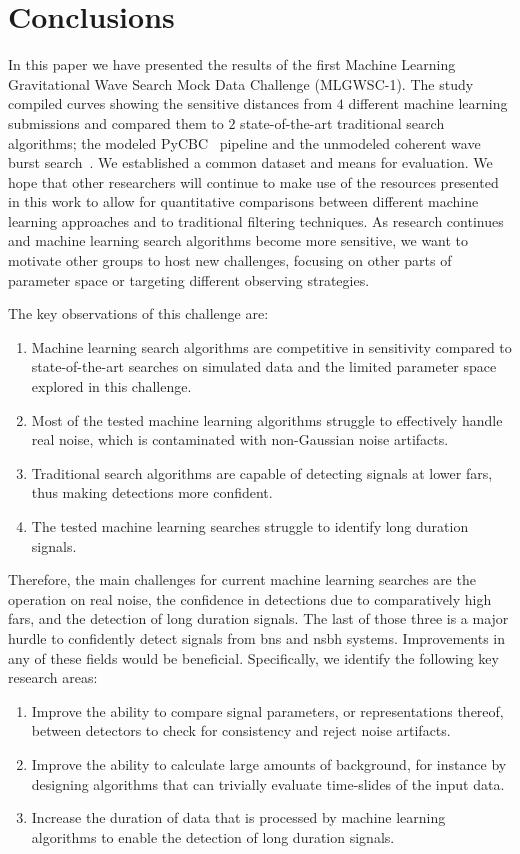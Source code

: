 \section{Conclusions}\label{sec:mlgwsc_conclusions}
In this paper we have presented the results of the first Machine Learning Gravitational Wave Search Mock Data Challenge (MLGWSC-1). The study compiled curves showing the sensitive distances from $4$ different machine learning submissions and compared them to $2$ state-of-the-art traditional search algorithms; the modeled PyCBC~\cite{Usman:2015kfa} pipeline and the unmodeled coherent wave burst search~\cite{Klimenko:2015ypf,Klimenko:2004qh}. We established a common dataset and means for evaluation. We hope that other researchers will continue to make use of the resources presented in this work to allow for quantitative comparisons between different machine learning approaches and to traditional filtering techniques. As research continues and machine learning search algorithms become more sensitive, we want to motivate other groups to host new challenges, focusing on other parts of parameter space or targeting different observing strategies.

The key observations of this challenge are:
\begin{enumerate}
    \item Machine learning search algorithms are competitive in sensitivity compared to state-of-the-art searches on simulated data and the limited parameter space explored in this challenge.
    \item Most of the tested machine learning algorithms struggle to effectively handle real noise, which is contaminated with non-Gaussian noise artifacts.
    \item Traditional search algorithms are capable of detecting signals at lower \acrshort{far}s, thus making detections more confident.
    \item The tested machine learning searches struggle to identify long duration signals.
\end{enumerate}
Therefore, the main challenges for current machine learning searches are the operation on real noise, the confidence in detections due to comparatively high \acrshort{far}s, and the detection of long duration signals. The last of those three is a major hurdle to confidently detect signals from \acrshort{bns} and \acrshort{nsbh} systems. Improvements in any of these fields would be beneficial. Specifically, we identify the following key research areas:
\begin{enumerate}
    \item Improve the ability to compare signal parameters, or representations thereof, between detectors to check for consistency and reject noise artifacts.
    \item Improve the ability to calculate large amounts of background, for instance by designing algorithms that can trivially evaluate time-slides of the input data.
    \item Increase the duration of data that is processed by machine learning algorithms to enable the detection of long duration signals.
\end{enumerate}

